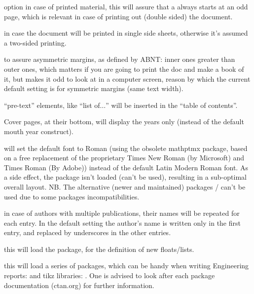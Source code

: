 \documentclass[article,nogeometry,english,tocdepth=3,secdepth=3]{ufrgscca} %
\begin{document}
\begin{describelist}{option}
	 { in case of printed material, this will assure that a \tsmacro{\chapter}{} always starts at an odd page, which is relevant in case of printing out (double sided) the document.}

	 { in case the document will be printed in single side sheets, otherwise it's assumed a two-sided printing.}

	 {to assure asymmetric margins, as defined by ABNT: inner ones greater than outer ones, which matters if you are going to print the doc and make a book of it, but makes it odd to look at in a computer screen, reason by which the current default setting is for symmetric margins (same text width).}

     { “pre-text” elements, like “list of$\dots$” will be inserted in the “table of contents”.}

     { Cover pages, at their bottom, will display the years only (instead of the default mouth year construct).}

     { will set the default font to Roman (using the obsolete mathptmx package, based on  a free replacement of the proprietary 
    Times New Roman (by Microsoft) and Times Roman (By Adobe)) instead of the default Latin Modern Roman font. 
    As a side effect, the package  isn't loaded (can't be used), resulting in a sub-optimal overall layout. 
    NB. The alternative (newer and maintained) packages / can't be used due to some packages incompatibilities.}

	 { in case of authors with multiple publications, their names will be repeated for each entry. 
In the default setting the author's name is written only in the first entry, and replaced by underscores in the other entries.}

	 { this will load the  package, for the definition of new floats/lists.}

	 { this will load a series of packages, which can be handy when writing Engineering reports:
       and tikz libraries: . 
       One is advised to look after each package documentation (ctan.org) for further information.}


\end{describelist}
\end{document}
